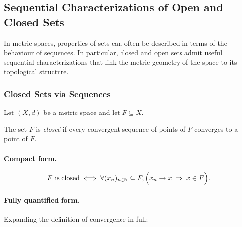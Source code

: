 %
%

\subsection{Sequential Characterizations of Open and Closed Sets}
\label{sec:sequential-characterizations}

In metric spaces, properties of sets can often be described
in terms of the behaviour of sequences.
In particular, closed and open sets admit useful sequential
characterizations that link the metric geometry of the space
to its topological structure.

\subsubsection{Closed Sets via Sequences}

\begin{definition}
\label{def:closed-sequential}
Let $(X,d)$ be a metric space and let $F \subseteq X$.

The set $F$ is \emph{closed} if every convergent sequence of
points of $F$ converges to a point of $F$.
\end{definition}

\paragraph{Compact form.}

\[
F \text{ is closed}
\iff
\forall (x_n)_{n\in\mathbb{N}} \subseteq F,
\Bigl(
  x_n \to x
  \;\Rightarrow\;
  x \in F
\Bigr).
\]

\paragraph{Fully quantified form.}

Expanding the definition of convergence in full:

